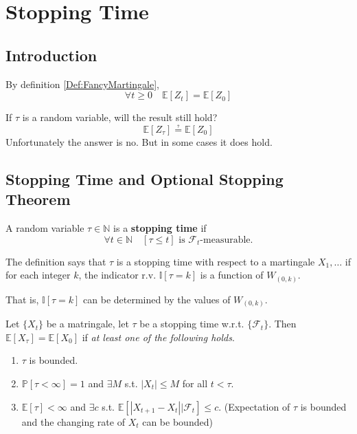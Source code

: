 \section{Stopping Time}
    \subsection{Introduction}
        By definition \ref{Def:FancyMartingale},
        \[ \forall t \ge 0 \quad \mathbb{E}[Z_t] = \mathbb{E}[Z_0] \]

        If $\tau$ is a random variable, will the result still hold?
        \[\mathbb{E}[Z_{\tau}] \questeq \mathbb{E}[Z_0]\]
        Unfortunately the answer is no. But in some cases it does hold.

    \subsection{Stopping Time and Optional Stopping Theorem}
        \begin{definition}\label{Def:StoppingTime}
            A random variable $\tau \in \mathbb{N}$ is a \textbf{stopping time} if
            \[ \forall t \in \mathbb{N} \quad [\tau \le t] \text{ is $\mathcal{F}_t$-measurable.} \]
        \end{definition}
        \begin{remark}
            The definition says that $\tau$ is a stopping time with respect to a martingale $X_1,\dots$ if for each integer $k$, the indicator r.v. $\mathbb{I}[\tau = k]$ is a function of $W_{(0,k)}$.

            That is, $\mathbb{I}[\tau = k]$ can be determined by the values of $W_{(0,k)}$.
        \end{remark}

        \begin{theorem}\label{Thm:OptionalStoppingTheorem}
            Let $\{X_t\}$ be a matringale, let $\tau$ be a stopping time w.r.t. $\{\mathcal{F}_t\}$. Then $\mathbb{E}[X_{\tau}] = \mathbb{E}[X_0]$ if \emph{at least one of the following holds}.
            \begin{enumerate}
                \item $\tau$ is bounded.
                \item $\mathbb{P}[\tau < \infty] = 1$ and $\exists M$ s.t. $|X_t| \le M$ for all $t < \tau$.
                \item $\mathbb{E}[\tau] < \infty$ and $\exists c$ s.t. $\mathbb{E}[|X_{t+1} - X_{t}||\mathcal{F}_t] \le c$. (Expectation of $\tau$ is bounded and the changing rate of $X_t$ can be bounded)
            \end{enumerate}
        \end{theorem}


